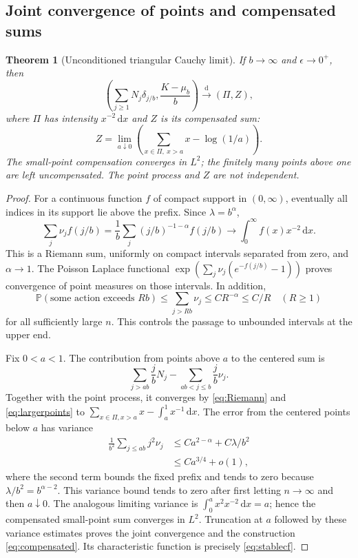 \documentclass[11pt,a4paper]{article}
\numberwithin{equation}{section}
\newtheorem{theorem}{Theorem}[section]
\theoremstyle{definition}
\theoremstyle{remark}
\newcommand{\Prob}{\mathbb P}
\newcommand{\ee}{\epsilon}
\newcommand{\dd}{\,\mathrm d}
\newcommand{\dto}{\xrightarrow{\mathrm d}}
\begin{document}
\subsection{Joint convergence of points and compensated sums}
\begin{theorem}[Unconditioned triangular Cauchy limit]\label{thm:cloud}
If $b\to\infty$ and $\ee\to0^+$, then
\begin{equation}\label{eq:cloud}
 \left(\sum_{j\ge1}N_j\delta_{j/b},\frac{K-\mu_b}{b}\right)
 \dto(\Pi,Z),
\end{equation}
where $\Pi$ has intensity $x^{-2}\dd x$ and $Z$ is its compensated sum:
\begin{equation}\label{eq:compensated}
 Z=\lim_{a\downarrow0}
 \left(\sum_{x\in\Pi,\ x>a}x-\log(1/a)\right).
\end{equation}
The small-point compensation converges in $L^2$; the finitely many points
above one are left uncompensated. The point process and $Z$ are not
independent.
\end{theorem}
\begin{proof}
For a continuous function $f$ of compact support in $(0,\infty)$, eventually
all indices in its support lie above the prefix. Since $\lambda=b^\alpha$,
\begin{equation}\label{eq:Riemann}
 \sum_j\nu_jf(j/b)
 =\frac1b\sum_j (j/b)^{-1-\alpha}f(j/b)
 \longrightarrow\int_0^\infty f(x)x^{-2}\dd x.
\end{equation}
This is a Riemann sum, uniformly on compact intervals separated from
zero, and $\alpha\to1$. The Poisson Laplace functional
$\exp(\sum_j\nu_j(e^{-f(j/b)}-1))$ proves convergence of point measures
on those intervals. In addition,
\begin{equation}\label{eq:largerpoints}
 \Prob(\text{some action exceeds }Rb)
 \le\sum_{j>Rb}\nu_j\le C R^{-\alpha}\le C/R\quad(R\ge1)
\end{equation}
for all sufficiently large $n$. This controls the passage to unbounded
intervals at the upper end.

Fix $0<a<1$. The contribution from points above $a$ to the centered sum is
\[
 \sum_{j>ab}\frac jbN_j-\sum_{ab<j\le b}\frac jb\nu_j.
\]
Together with the point process, it converges by \eqref{eq:Riemann} and
\eqref{eq:largerpoints} to
$\sum_{x\in\Pi,x>a}x-\int_a^1x^{-1}\dd x$.
The error from the centered points below $a$ has variance
\begin{align*}
 \frac1{b^2}\sum_{j\le ab}j^2\nu_j
 &\le C a^{2-\alpha}+C\lambda/b^2\\
 &\le C a^{3/4}+o(1),
\end{align*}
where the second term bounds the fixed prefix and tends to zero because
$\lambda/b^2=b^{\alpha-2}$. This variance bound tends to zero after first
letting $n\to\infty$ and then $a\downarrow0$.
The analogous limiting variance is
$\int_0^a x^2x^{-2}\dd x=a$; hence the compensated small-point sum
converges in $L^2$. Truncation at $a$ followed by these variance estimates
proves the joint convergence and the construction \eqref{eq:compensated}.
Its characteristic function is precisely \eqref{eq:stablecf}.
\end{proof}
\end{document}
